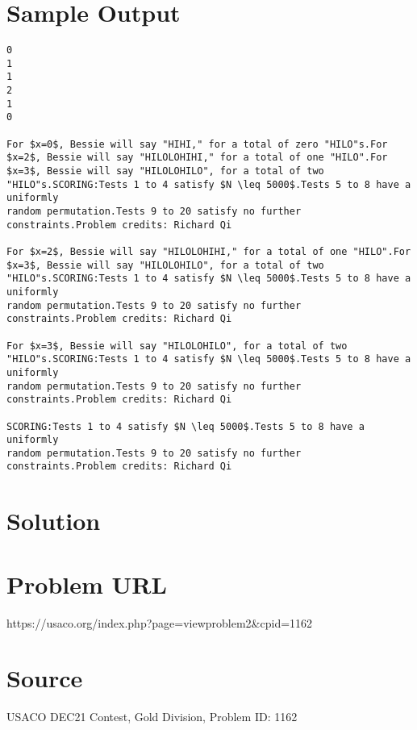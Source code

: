 \documentclass[12pt]{article}
\begin{document}
\section*{Sample Output}
\begin{verbatim}
0
1
1
2
1
0

For $x=0$, Bessie will say "HIHI," for a total of zero "HILO"s.For $x=2$, Bessie will say "HILOLOHIHI," for a total of one "HILO".For $x=3$, Bessie will say "HILOLOHILO", for a total of two "HILO"s.SCORING:Tests 1 to 4 satisfy $N \leq 5000$.Tests 5 to 8 have a uniformly
random permutation.Tests 9 to 20 satisfy no further constraints.Problem credits: Richard Qi

For $x=2$, Bessie will say "HILOLOHIHI," for a total of one "HILO".For $x=3$, Bessie will say "HILOLOHILO", for a total of two "HILO"s.SCORING:Tests 1 to 4 satisfy $N \leq 5000$.Tests 5 to 8 have a uniformly
random permutation.Tests 9 to 20 satisfy no further constraints.Problem credits: Richard Qi

For $x=3$, Bessie will say "HILOLOHILO", for a total of two "HILO"s.SCORING:Tests 1 to 4 satisfy $N \leq 5000$.Tests 5 to 8 have a uniformly
random permutation.Tests 9 to 20 satisfy no further constraints.Problem credits: Richard Qi

SCORING:Tests 1 to 4 satisfy $N \leq 5000$.Tests 5 to 8 have a uniformly
random permutation.Tests 9 to 20 satisfy no further constraints.Problem credits: Richard Qi
\end{verbatim}

\section*{Solution}


\section*{Problem URL}
https://usaco.org/index.php?page=viewproblem2&cpid=1162

\section*{Source}
USACO DEC21 Contest, Gold Division, Problem ID: 1162
\end{document}
